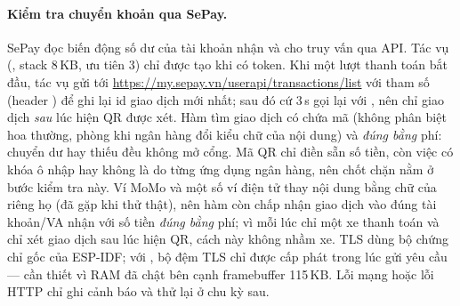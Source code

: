 \paragraph{Kiểm tra chuyển khoản qua SePay.} SePay đọc biến động số dư của tài khoản
nhận và cho truy vấn qua API. Tác vụ  (, stack
8\,KB, ưu tiên 3) chỉ được tạo khi có token. Khi một lượt thanh toán bắt đầu, tác vụ gửi
 tới \url{https://my.sepay.vn/userapi/transactions/list} với tham số
 (header ) để ghi lại id giao dịch mới nhất; sau đó
cứ 3\,s gọi lại với , nên chỉ giao dịch \emph{sau} lúc hiện QR
được xét. Hàm  tìm giao dịch có 
chứa mã (không phân biệt hoa thường, phòng khi ngân hàng đổi kiểu chữ của nội dung) và
 \emph{đúng bằng} phí: chuyển dư hay thiếu đều không mở cổng. Mã QR chỉ điền sẵn số tiền, còn việc có khóa ô nhập hay không là do từng ứng dụng ngân hàng, nên chốt chặn nằm ở bước kiểm tra này. Ví MoMo và một số ví điện tử thay nội dung bằng chữ của riêng họ (đã gặp khi thử thật), nên hàm  còn chấp nhận giao dịch vào đúng tài khoản/VA nhận với số tiền \emph{đúng bằng} phí; vì mỗi lúc chỉ một xe thanh toán và chỉ xét giao dịch sau lúc hiện QR, cách này không nhầm xe. TLS dùng bộ chứng chỉ gốc của ESP-IDF; với
, bộ đệm TLS chỉ được cấp phát trong lúc gửi yêu
cầu — cần thiết vì RAM đã chật bên cạnh framebuffer 115\,KB. Lỗi mạng hoặc lỗi HTTP chỉ
ghi cảnh báo và thử lại ở chu kỳ sau.

